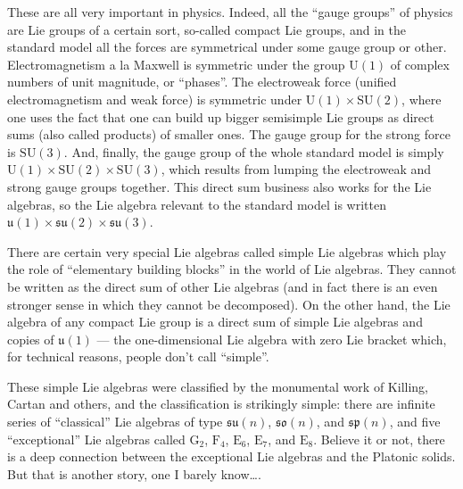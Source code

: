 \documentclass{article}
\begin{document}
These are all very important in physics. Indeed, all the ``gauge
groups'' of physics are Lie groups of a certain sort, so-called compact
Lie groups, and in the standard model all the forces are symmetrical
under some gauge group or other. Electromagnetism a la Maxwell is
symmetric under the group \(\mathrm{U}(1)\) of complex numbers of unit
magnitude, or ``phases''. The electroweak force (unified
electromagnetism and weak force) is symmetric under
\(\mathrm{U}(1) \times \mathrm{SU}(2)\), where one uses the fact that
one can build up bigger semisimple Lie groups as direct sums (also
called products) of smaller ones. The gauge group for the strong force
is \(\mathrm{SU}(3)\). And, finally, the gauge group of the whole
standard model is simply
\(\mathrm{U}(1) \times \mathrm{SU}(2) \times \mathrm{SU}(3)\), which
results from lumping the electroweak and strong gauge groups together.
This direct sum business also works for the Lie algebras, so the Lie
algebra relevant to the standard model is written
\(\mathfrak{u}(1) \times \mathfrak{su}(2) \times \mathfrak{su}(3)\).

There are certain very special Lie algebras called simple Lie algebras
which play the role of ``elementary building blocks'' in the world of
Lie algebras. They cannot be written as the direct sum of other Lie
algebras (and in fact there is an even stronger sense in which they
cannot be decomposed). On the other hand, the Lie algebra of any compact
Lie group is a direct sum of simple Lie algebras and copies of
\(\mathfrak{u}(1)\) --- the one-dimensional Lie algebra with zero Lie
bracket which, for technical reasons, people don't call ``simple''.

These simple Lie algebras were classified by the monumental work of
Killing, Cartan and others, and the classification is strikingly simple:
there are infinite series of ``classical'' Lie algebras of type
\(\mathfrak{su}(n)\), \(\mathfrak{so}(n)\), and \(\mathfrak{sp}(n)\),
and five ``exceptional'' Lie algebras called \(\mathrm{G}_2\),
\(\mathrm{F}_4\), \(\mathrm{E}_6\), \(\mathrm{E}_7\), and
\(\mathrm{E}_8\). Believe it or not, there is a deep connection between
the exceptional Lie algebras and the Platonic solids. But that is
another story, one I barely know\ldots.
\end{document}
